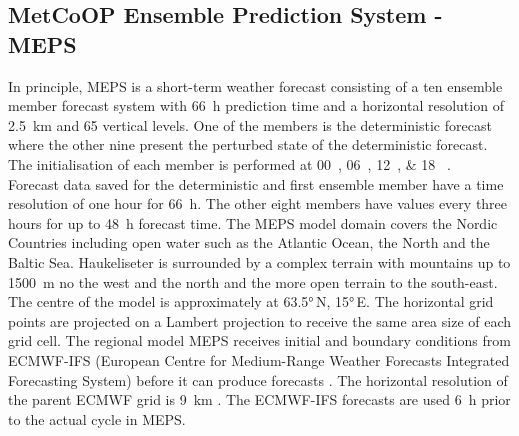 \subsection{MetCoOP Ensemble Prediction System - MEPS}
In principle, MEPS is a short-term weather forecast consisting of a ten ensemble member  forecast system with \SI{66}{\hour} prediction time and a horizontal resolution of \SI{2.5}{\km} and 65 vertical levels. One of the members is the deterministic forecast where the other nine present the perturbed state of the deterministic forecast. The initialisation of each member is performed at \SIlist{00;06;12;18}{\UTC} \citep{metcoop_wiki_description_2017}.
\\ 
Forecast data saved for the deterministic and first ensemble member have a time resolution of one hour for \SI{66}{\hour}. The other eight members have values every three hours for up to \SI{48}{\hour} forecast time.
% 
The MEPS model domain %
covers the Nordic Countries including open water such as the Atlantic Ocean, the North and the Baltic Sea. 
Haukeliseter is surrounded by a complex terrain with mountains up to \SI{1500}{\metre} no the west and the north and the more open terrain to the south-east.
\\
The centre of the model is approximately at \ang{63.5}\,N, \ang{15}\,E. 
The horizontal grid points are projected on a Lambert projection to receive the same area size of each grid cell. 
The regional model MEPS receives initial and boundary conditions from ECMWF-IFS (European Centre for Medium-Range Weather Forecasts Integrated Forecasting System) before it can produce forecasts \citep{muller_arome-metcoop:_2017}. The horizontal resolution of the parent ECMWF grid is \SI{9}{\km} \citep{homleid_verification_2016}. The ECMWF-IFS forecasts are used \SI{6}{\hour} prior to the actual cycle in MEPS.
